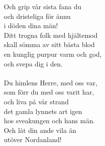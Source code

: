Och grip vår sista fana du\\
och dristeliga för ännu\\
i döden dina män!\\
Ditt trogna folk med hjältemod\\
skall sömma av sitt bästa blod\\
en kunglig purpur varm och god,\\
och svepa dig i den.\\
\\
Du himlens Herre, med oss var,\\
som förr du med oss varit har,\\
och liva på vår strand\\
det gamla lynnets art igen\\
hos sveakungen och hans män.\\
Och låt din ande vila än\\
utöver Nordanland!\\
